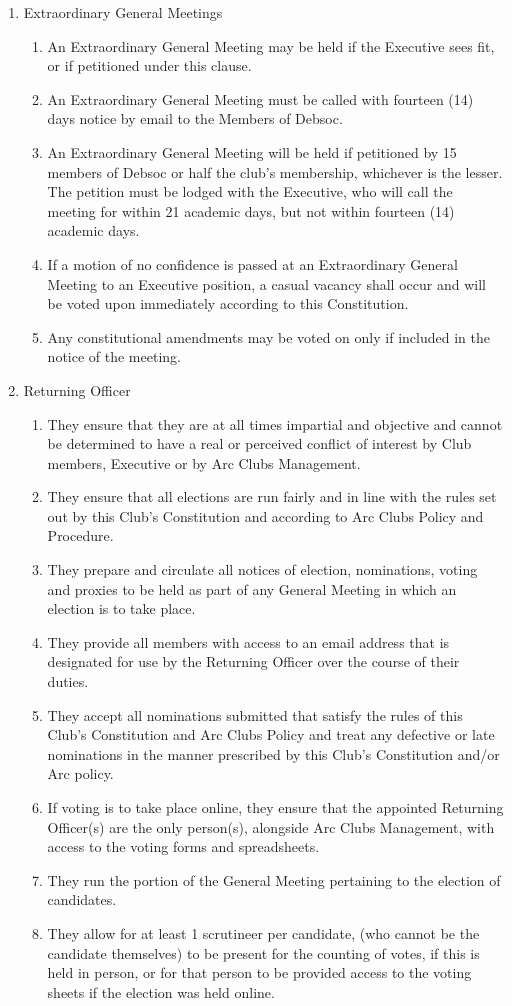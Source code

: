 \begin{enumerate}
\item Extraordinary General Meetings \label{egm_procedure}
  \begin{enumerate}
  \item An Extraordinary General Meeting may be held if the Executive sees fit, or if petitioned under this clause.
  \item An Extraordinary General Meeting must be called with fourteen (14) days notice by email to the Members of Debsoc.
  \item An Extraordinary General Meeting will be held if petitioned by 15 members of Debsoc or half the club's membership, whichever is the lesser. The petition must be lodged with the Executive, who will call the meeting for within 21 academic days, but not within fourteen (14) academic days.
  \item If a motion of no confidence is passed at an Extraordinary General Meeting to an Executive position, a casual vacancy shall occur and will be voted upon immediately according to this Constitution.
  \item Any constitutional amendments may be voted on only if included in the notice of the meeting.
  \end{enumerate}

\item Returning Officer
  \begin{enumerate}
  \item They ensure that they are at all times impartial and objective and cannot be determined to have a real or perceived conflict of interest by Club members, Executive or by Arc Clubs Management.
  \item They ensure that all elections are run fairly and in line with the rules set out by this Club’s Constitution and according to Arc Clubs Policy and Procedure.
  \item They prepare and circulate all notices of election, nominations, voting and proxies to be held as part of any General Meeting in which an election is to take place.
  \item They provide all members with access to an email address that is designated for use by the Returning Officer over the course of their duties.
  \item They accept all nominations submitted that satisfy the rules of this Club’s Constitution and Arc Clubs Policy and treat any defective or late nominations in the manner prescribed by this Club’s Constitution and/or Arc policy.
  \item If voting is to take place online, they ensure that the appointed Returning Officer(s) are the only person(s), alongside Arc Clubs Management, with access to the voting forms and spreadsheets.
  \item They run the portion of the General Meeting pertaining to the election of candidates.
  \item They allow for at least 1 scrutineer per candidate, (who cannot be the candidate themselves) to be present for the counting of votes, if this is held in person, or for that person to be provided access to the voting sheets if the election was held online.
  \end{enumerate}


\end{enumerate}
